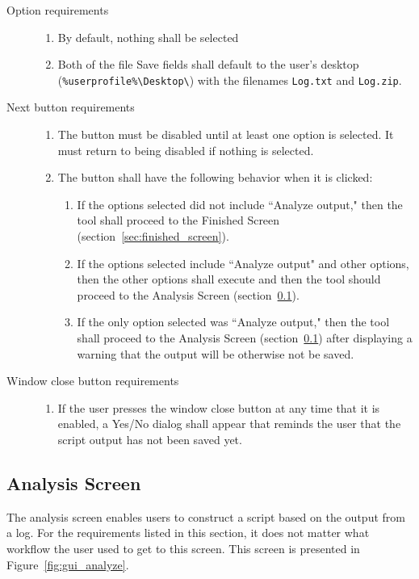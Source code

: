 \begin{description}
\item[Option requirements] \hfill
\begin{enumerate}
  \item By default, nothing shall be selected
  \item Both of the file Save fields shall default to the user's desktop
  (\verb|%userprofile%\Desktop\|) with the filenames \verb|Log.txt| and
  \verb|Log.zip|.
\end{enumerate}
\item[Next button requirements] \hfill
\begin{enumerate}
  \item The button must be disabled until at least one option is selected. It
  must return to being disabled if nothing is selected.
  \item The button shall have the following behavior when it is clicked:
  \begin{enumerate}
    \item If the options selected did not include ``Analyze output," then the
    tool shall proceed to the Finished Screen
    (section~\ref{sec:finished_screen}).
    \item If the options selected include ``Analyze output" and other options,
    then the other options shall execute and then the tool should proceed to
    the Analysis Screen (section~\ref{sec:analysis_screen}).
    \item If the only option selected was ``Analyze output," then the tool
    shall proceed to the Analysis Screen (section~\ref{sec:analysis_screen})
    after displaying a warning that the output will be otherwise not be saved.
  \end{enumerate}
\end{enumerate}
\item[Window close button requirements] \hfill
\begin{enumerate}
  \item If the user presses the window close button at any time that it is
  enabled, a Yes/No dialog shall appear that reminds the user that the script
  output has not been saved yet.
\end{enumerate}
\end{description}


\subsection{Analysis Screen} \label{sec:analysis_screen}
The analysis screen enables users to construct a script based on the output
from a log.  For the requirements listed in this section, it does not
matter what workflow the user used to get to this screen.  This screen is
presented in Figure~\ref{fig:gui_analyze}.

